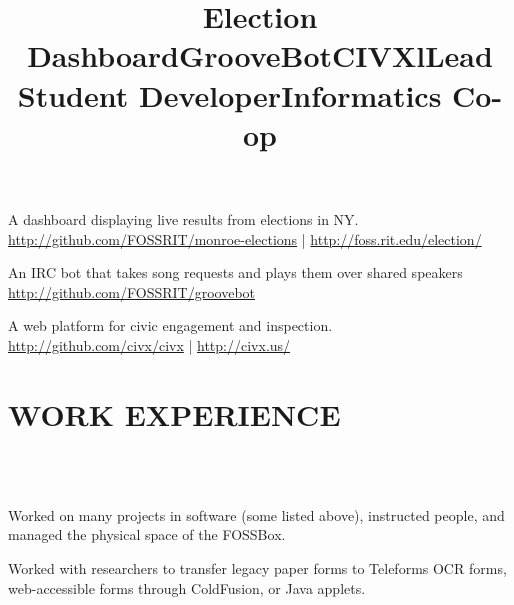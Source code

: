 \documentclass[linemargin]{res}
\begin{document}
\begin{resume}
    \title{Election Dashboard}
    \begin{position}
        A dashboard displaying live results from elections in NY.\\
        \url{http://github.com/FOSSRIT/monroe-elections} | \url{http://foss.rit.edu/election/}
    \end{position}

    \title{GrooveBot}
    \begin{position}
        An IRC bot that takes song requests and plays them over shared speakers\\
        \url{http://github.com/FOSSRIT/groovebot}
    \end{position}

    \title{CIVX}
    \begin{position}
        A web platform for civic engagement and inspection.\\
        \url{http://github.com/civx/civx} | \url{http://civx.us/}
    \end{position}

\section{WORK EXPERIENCE}
    \begin{format}
        \title{l}\\
        \\
        \body
    \end{format}

    \title{Lead Student Developer}
    \begin{position}
        Worked on many projects in software (some listed above), instructed
        people, and managed the physical space of the FOSSBox.
    \end{position}

    \title{Informatics Co-op}
    \begin{position}
        Worked with researchers to transfer legacy paper forms to Teleforms OCR
        forms, web-accessible forms through ColdFusion, or Java applets.
    \end{position}


\end{resume}
\end{document}

